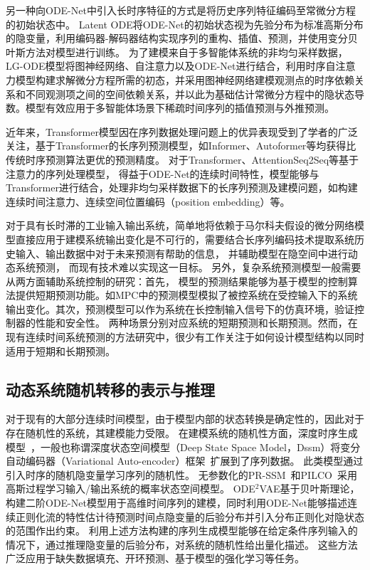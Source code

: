 另一种向ODE-Net中引入长时序特征的方式是将历史序列特征编码至常微分方程的初始状态中。
Latent ODE\cite{10.5555/3454287.3454765}将ODE-Net的初始状态视为先验分布为标准高斯分布的隐变量，利用编码器-解码器结构实现序列的重构、插值、预测，并使用变分贝叶斯方法对模型进行训练。
为了建模来自于多智能体系统的非均匀采样数据，LG-ODE模型\cite{Huang2020}将图神经网络、自注意力以及ODE-Net进行结合，利用时序自注意力模型构建求解微分方程所需的初态，并采用图神经网络建模观测点的时序依赖关系和不同观测项之间的空间依赖关系，并以此为基础估计常微分方程中的隐状态导数。模型有效应用于多智能体场景下稀疏时间序列的插值预测与外推预测。

近年来，Transformer模型\cite{Vaswani2017}因在序列数据处理问题上的优异表现受到了学者的广泛关注，基于Transformer的长序列预测模型，如Informer\cite{Zhou2020}、Autoformer\cite{Wu2021}等均获得比传统时序预测算法更优的预测精度。
对于Transformer、AttentionSeq2Seq等基于注意力的序列处理模型，
得益于ODE-Net的连续时间特性，模型能够与Transformer进行结合，处理非均匀采样数据下的长序列预测及建模问题，如构建连续时间注意力\cite{chen2021continuous}、连续空间位置编码（position embedding）\cite{Liu2020}等。

对于具有长时滞的工业输入输出系统，简单地将依赖于马尔科夫假设的微分网络模型直接应用于建模系统输出变化是不可行的，需要结合长序列编码技术提取系统历史输入、输出数据中对于未来预测有帮助的信息，
并辅助模型在隐空间中进行动态系统预测，
而现有技术难以实现这一目标。
另外，复杂系统预测模型一般需要从两方面辅助系统控制的研究：首先，
模型的预测结果能够为基于模型的控制算法提供短期预测功能。如MPC中的预测模型模拟了被控系统在受控输入下的系统输出变化。其次，预测模型可以作为系统在长控制输入信号下的仿真环境，验证控制器的性能和安全性。
两种场景分别对应系统的短期预测和长期预测。然而，在现有连续时间系统预测的方法研究中，很少有工作关注于如何设计模型结构以同时适用于短期和长期预测。


\subsection{动态系统随机转移的表示与推理}
对于现有的大部分连续时间模型，由于模型内部的状态转换是确定性的，因此对于存在随机性的系统，其建模能力受限。
在建模系统的随机性方面，深度时序生成模型~\cite{Fraccaro2016,Chung2015,Karl2017}，一般也称谓深度状态空间模型（Deep State Space Model，Dssm）将变分自动编码器（Variational Auto-encoder）框架~\cite{kingma2013auto}扩展到了序列数据。
此类模型通过引入时序的随机隐变量学习序列的随机性。
无参数化的PR-SSM~\cite{doerr2018probabilistic}和PILCO~\cite{deisenroth2011pilco}采用高斯过程学习输入/输出系统的概率状态空间模型。
ODE$^2$VAE\cite{Yildiz2019}基于贝叶斯理论，构建二阶ODE-Net模型用于高维时间序列的建模，同时利用ODE-Net能够描述连续正则化流的特性估计待预测时间点隐变量的后验分布并引入分布正则化对隐状态的范围作出约束。
利用上述方法构建的序列生成模型能够在给定条件序列输入的情况下，通过推理隐变量的后验分布，对系统的随机性给出量化描述。
这些方法广泛应用于缺失数据填充\cite{Fraccaro2017}、开环预测\cite{Hafner2019}、基于模型的强化学习等任务\cite{Hafner2019}。

